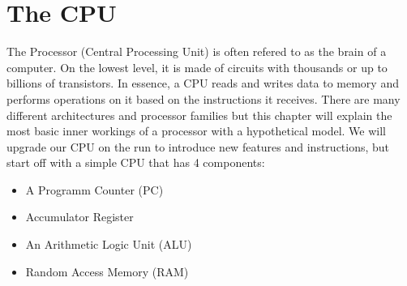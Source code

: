 \section{The CPU}

The Processor (Central Processing Unit) is often refered to as the brain of a computer. On the
lowest level, it is made of circuits with thousands or up to billions of transistors. In
essence, a CPU reads and writes data to memory and performs operations on it based on the
instructions it receives. There are many different architectures and processor families but
this chapter will explain the most basic inner workings of a processor with a hypothetical
model. We will upgrade our CPU on the run to introduce new features and instructions, but
start off with a simple CPU that has 4 components:

\begin{itemize}
	\item A Programm Counter (PC)
	\item Accumulator Register
	\item An Arithmetic Logic Unit (ALU)
	\item Random Access Memory (RAM)
\end{itemize}

